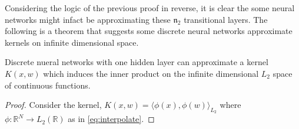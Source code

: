 Considering the logic of the previous proof in reverse, it is clear the some neural networks might infact be approximating these $\mathfrak{n}_2$ transitional layers. The following is a theorem that suggests some discrete neural networks approximate kernels on infinite dimensional space.

\begin{theorem}
	Discrete nueral networks with one hidden layer can approximate a kernel $K(x,w)$ which induces the inner product on the infinite dimensional $L_2$ space of continuous functions.
\end{theorem}
\begin{proof}
	Consider the kernel, $K(x,  w) = \langle \phi(x), \phi(w) \rangle_{L_2}$ where $\phi:\mathbb{R}^N \to L_2(\mathbb R)$ as in \eqref{eq:interpolate}. 
\end{proof}